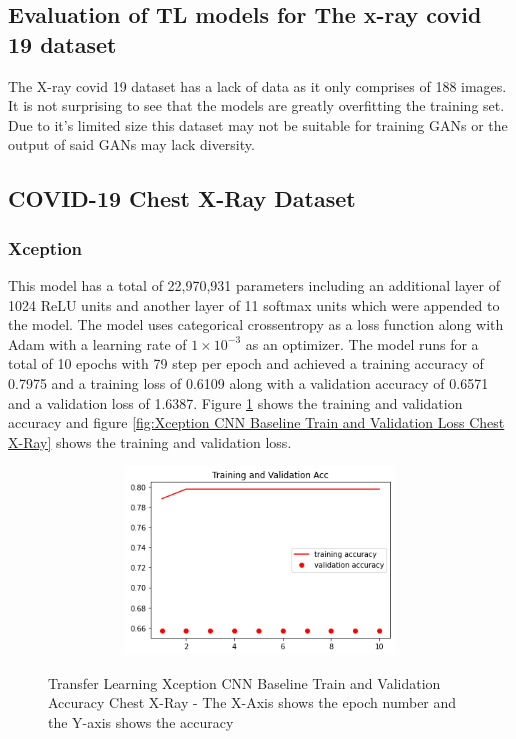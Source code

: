\subsection{Evaluation of TL models for The x-ray covid 19 dataset}
The X-ray covid 19 dataset has a lack of data as it only comprises of 188 images.  It is not surprising to see that the models are greatly overfitting the training set.  Due to it's limited size this dataset may not be suitable for training GANs or the output of said GANs may lack diversity.
\subsection{COVID-19 Chest X-Ray Dataset}
\subsubsection{Xception}
This model has a total of 22,970,931 parameters including an additional layer of 1024 ReLU units and another layer of 11 softmax units which were appended to the model.  The model uses categorical crossentropy as a loss function along with Adam with a learning rate of $1 \times 10^{-3}$ as an optimizer.  The model runs for a total of 10 epochs with 79 step per epoch and achieved a training accuracy of 0.7975 and a training loss of 0.6109 along with a validation accuracy of 0.6571 and a validation loss of 1.6387. Figure \ref{fig:Xception CNN Baseline Train and Validation Accuracy Chest X-Ray} shows the training and validation accuracy and figure \ref{fig:Xception CNN Baseline Train and Validation Loss Chest X-Ray} shows the training and validation loss.
 \begin{figure}[H]
    \centering
    \includegraphics[width=1\textwidth,height=5cm,keepaspectratio]{Images/XceptionBaselineTrainingValidationAccuracyChestX-Ray.png}\\
    \caption{Transfer Learning Xception CNN Baseline Train and Validation Accuracy Chest X-Ray - The X-Axis shows the epoch number and the Y-axis shows the accuracy}
    \label{fig:Xception CNN Baseline Train and Validation Accuracy Chest X-Ray}
\end{figure}
